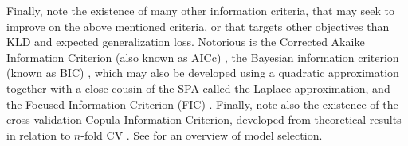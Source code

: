 Finally, note the existence of many other information criteria, that may seek to improve on the above mentioned criteria, or that targets other objectives than KLD and expected generalization loss. Notorious is the Corrected Akaike Information Criterion (also known as AICc) \citep{sugiura1978further}, the Bayesian information criterion (known as BIC) \citep{schwarz1978estimating}, which may also be developed using a quadratic approximation together with a close-cousin of the SPA called the Laplace approximation, and the Focused Information Criterion (FIC) \citep{claeskens2003focused}.
Finally, note also the existence of the cross-validation Copula Information Criterion, developed from theoretical results in relation to $n$-fold CV \citep{gronneberg2014copula}.
See \citet{claeskens2008model} for an overview of model selection. 

